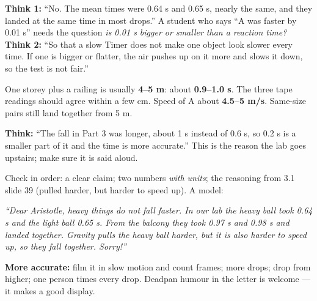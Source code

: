 \documentclass[12pt,a4paper]{article}
\begin{document}
\smallskip
\noindent\textbf{Think 1:} ``No. The mean times were 0.64 s and 0.65 s, nearly
the same, and they landed at the same time in most drops.'' A student who says
``A was faster by 0.01 s'' needs the question \emph{is 0.01 s bigger or smaller
than a reaction time?} \\
\textbf{Think 2:} ``So that a slow Timer does not make one object look slower
every time. If one is bigger or flatter, the air pushes up on it more and slows
it down, so the test is not fair.''

\noindent One storey plus a railing is usually \textbf{4--5 m}: about
\textbf{0.9--1.0 s}. The three tape readings should agree within a few cm. Speed
of A about \textbf{4.5--5 m/s}. Same-size pairs still land together from 5 m.

\smallskip
\noindent\textbf{Think:} ``The fall in Part 3 was longer, about 1 s instead of
0.6 s, so 0.2 s is a smaller part of it and the time is more accurate.'' This is
the reason the lab goes upstairs; make sure it is said aloud.

\noindent Check in order: a clear claim; two numbers \emph{with units}; the
reasoning from 3.1 slide 39 (pulled harder, but harder to speed up). A model:

\smallskip
\noindent\emph{``Dear Aristotle, heavy things do not fall faster. In our lab the
heavy ball took 0.64 s and the light ball 0.65 s. From the balcony they took
0.97 s and 0.98 s and landed together. Gravity pulls the heavy ball harder, but
it is also harder to speed up, so they fall together. Sorry!''}

\smallskip
\noindent\textbf{More accurate:} film it in slow motion and count frames; more
drops; drop from higher; one person times every drop. Deadpan humour in the
letter is welcome --- it makes a good display.
\fi
\end{document}

